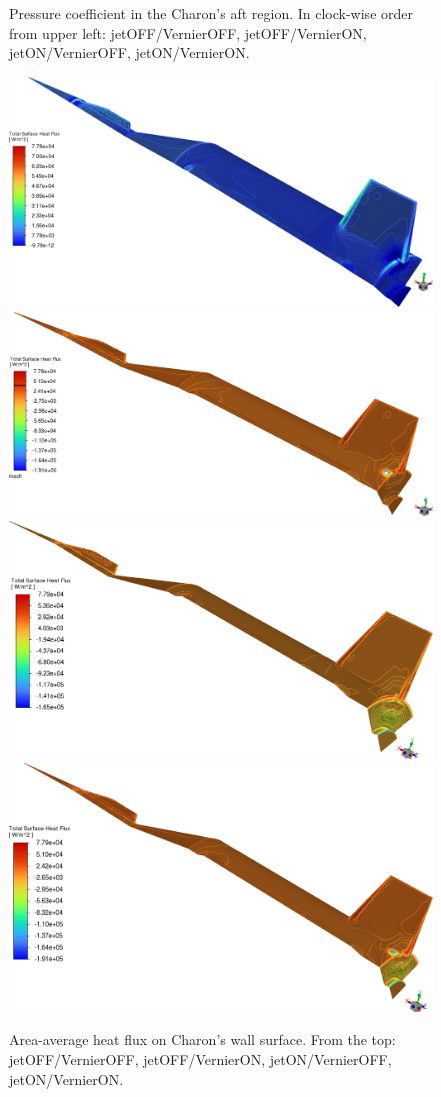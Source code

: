 \documentclass[12pt]{article}
\begin{document}
\begin{figure}[H]
    \caption{Pressure coefficient in the Charon's aft region. In clock-wise order from upper left: jetOFF/VernierOFF, jetOFF/VernierON, jetON/VernierOFF, jetON/VernierON.}
    \label{fig:t65s_cp}
\end{figure}

\begin{figure}[H]
    \centering
    \includegraphics[width=0.685\linewidth]{figs/t65s/jetOFFVernierOFF/t65s_M1p08_jetOFFVernierOFF-31-02250_HF.png}\\
    \includegraphics[width=0.685\linewidth]{figs/t65s/jetOFFVernierON/t65s_M1p08_jetOFFVernieON_HF.png}\\
    \includegraphics[width=0.685\linewidth]{figs/t65s/jetONVernierOFF/t65s_M1p08_jetONVernierOFF_HF_full.png}\\
    \includegraphics[width=0.685\linewidth]{figs/t65s/jetONVernierON/t65s_M1p08_jetONVernierON_HF_full.png}
    \caption{Area-average heat flux on Charon's wall surface. From the top: jetOFF/VernierOFF, jetOFF/VernierON, jetON/VernierOFF, jetON/VernierON.}
    \label{fig:t65s_hf}
\end{figure}
\end{document}
